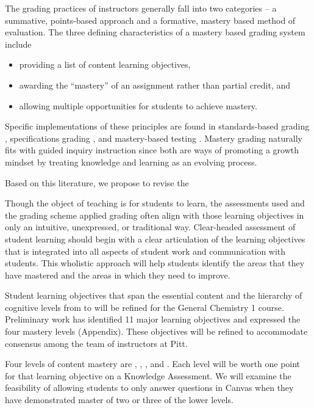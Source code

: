 \documentclass[10pt,letterpaper]{article}
\begin{document}
The grading practices of instructors generally fall into two categories -- a summative, points-based approach and a formative, mastery based method of evaluation. The three defining characteristics of a mastery based grading system include   \citep{Kelly2020} 
\begin{itemize}[nosep]
\item providing a list of content learning objectives, 
\item awarding the
  ``mastery'' of an assignment rather than partial credit, and
  \item allowing multiple opportunities for students to achieve mastery.
\end{itemize}
Specific implementations of these principles are found in standards-based grading \citep{Marzano2011}, specifications grading \citep{Nilson2015}, and mastery-based testing \citep{Collins2019}. Mastery grading naturally fits with guided inquiry instruction since both are ways of promoting a growth mindset by treating knowledge and learning as an evolving process. \cite{selbach2020}

Based on this literature, we propose to revise the 

%
%
Though the object of teaching is for students to learn,  the assessments used and the grading scheme applied grading often align with those learning objectives in only an intuitive, unexpressed, or traditional way. Clear-headed assessment of student learning should begin with a clear articulation of the learning objectives that is integrated into all aspects of student work and communication with students. This wholistic approach will help students identify the areas that they have mastered and the areas in which  they need to improve.

Student learning objectives that span the essential content and the hierarchy of cognitive levels from \recall to \use will be refined for the General Chemistry 1 course. Preliminary work has identified 11 major learning objectives and expressed the four mastery levels (Appendix). These objectives will be refined to accommodate consensus among the team of \pogil instructors at Pitt. 


 Four levels of content mastery are \recall, \comprehension, \analysis, and \use. Each level will be worth one point for that learning objective on a Knowledge Assessment. We will examine the feasibility of allowing students to only answer \use questions in Canvas when they have demonstrated master of two or three of the lower levels. 
\end{document}
